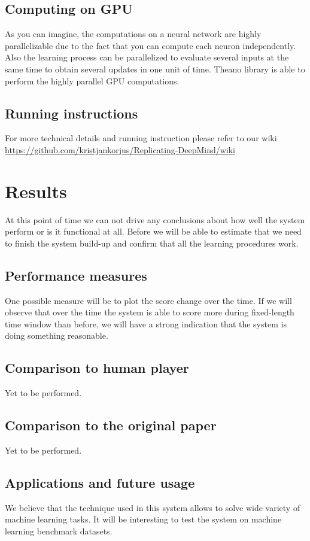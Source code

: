 \documentclass[a4paper,12pt]{article}
\begin{document}
\subsection{Computing on GPU}
As you can imagine, the computations on a neural network are highly parallelizable due to the fact that you can compute each neuron independently. Also the learning process can be parallelized to evaluate several inputs at the same time to obtain several updates in one unit of time. Theano library is able to perform the highly parallel GPU computations.

\subsection{Running instructions}
For more technical details and running instruction please refer to our wiki \url{https://github.com/kristjankorjus/Replicating-DeepMind/wiki}


%
%
\pagebreak
\section{Results}
At this point of time we can not drive any conclusions about how well the system perform or is it functional at all. Before we will be able to estimate that we need to finish the system build-up and confirm that all the learning procedures work.

\subsection{Performance measures}
One possible measure will be to plot the score change over the time. If we will observe that over the time the system is able to score more during fixed-length time window than before, we will have a strong indication that the system is doing something reasonable.

\subsection{Comparison to human player}
Yet to be performed.

\subsection{Comparison to the original paper}
Yet to be performed.

\subsection{Applications and future usage}
We believe that the technique used in this system allows to solve wide variety of machine learning tasks. It will be interesting to test the system on machine learning benchmark datasets.



%
%
\pagebreak
{}


\end{document}

